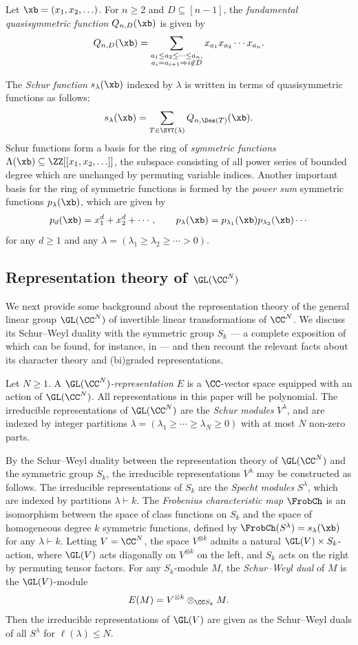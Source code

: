 Let $\xb = (x_1,x_2,\ldots)$. For $n \ge 2$ and $D \subseteq [n-1]$, the \emph{fundamental quasisymmetric function} $Q_{n,D}(\xb)$ is given by
\[
Q_{n,D}(\xb) = \sum_{\substack{a_1 \le a_2 \le \cdots \le a_n, \\ a_i = a_{i+1} \Rightarrow i \not\in D}} x_{a_1} x_{a_2} \cdots x_{a_n}.
\]

The \emph{Schur function} $s_\lambda(\xb)$ indexed by $\lambda$ is written in terms of quasisymmetric functions as follows:
\[
s_\lambda(\xb) = \sum_{T \in \SYT(\lambda)} Q_{n,\Des(T)}(\xb).
\]
Schur functions form a basis for the ring of \emph{symmetric functions} $\Lambda(\xb) \subseteq \ZZ[[x_1,x_2,\ldots]]$, the subspace consisting of all power series of bounded degree which are unchanged by permuting variable indices. Another important basis for the ring of symmetric functions is formed by the \emph{power sum} symmetric functions $p_\lambda(\xb)$, which are given by
\[
p_d(\xb) = x_1^d + x_2^d + \cdots, \qquad p_\lambda(\xb) = p_{\lambda_1}(\xb)p_{\lambda_2}(\xb) \cdots
\]
for any $d \ge 1$ and any $\lambda = (\lambda_1 \ge \lambda_2 \ge \cdots > 0)$.

\subsection{Representation theory of \texorpdfstring{$\GL(\CC^N)$}{GL(C\^{}N)}}
We next provide some background about the representation theory of the general linear group $\GL(\CC^N)$ of invertible linear transformations of $\CC^N$. We discuss its Schur--Weyl duality with the symmetric group $S_k$ --- a complete exposition of which can be found, for instance, in \cite{Ful} --- and then recount the relevant facts about its character theory and (bi)graded representations.

Let $N \ge 1$. A \emph{$\GL(\CC^N)$-representation} $E$ is a $\CC$-vector space equipped with an action of $\GL(\CC^N)$. All representations in this paper will be polynomial. The irreducible representations of $\GL(\CC^N)$ are the \emph{Schur modules} $V^\lambda$, and are indexed by integer partitions $\lambda = (\lambda_1 \ge \cdots \ge \lambda_N \ge 0)$ with at most $N$ non-zero parts. 

By the Schur--Weyl duality between the representation theory of $\GL(\CC^N)$ and the symmetric group $S_k$, the irreducible representations $V^\lambda$ may be constructed as follows. The irreducible representations of $S_k$ are the \emph{Specht modules} $S^\lambda$, which are indexed by partitions $\lambda \vdash k$. The \emph{Frobenius characteristic map} $\FrobCh$ is an isomorphism between the space of class functions on $S_k$ and the space of homogeneous degree $k$ symmetric functions, defined by $\FrobCh(S^\lambda) = s_\lambda(\xb)$ for any $\lambda \vdash k$. Letting $V = \CC^N$, the space $V^{\otimes k}$ admits a natural $\GL(V) \times S_k$-action, where $\GL(V)$ acts diagonally on $V^{\otimes k}$ on the left, and $S_k$ acts on the right by permuting tensor factors. For any $S_k$-module $M$, the \emph{Schur--Weyl dual} of $M$ is the $\GL(V)$-module
\[
E(M) = V^{\otimes k} \otimes_{\CC S_k} M.
\]
Then the irreducible representations of $\GL(V)$ are given as the Schur--Weyl duals of all $S^\lambda$ for $\ell(\lambda) \le N$.

